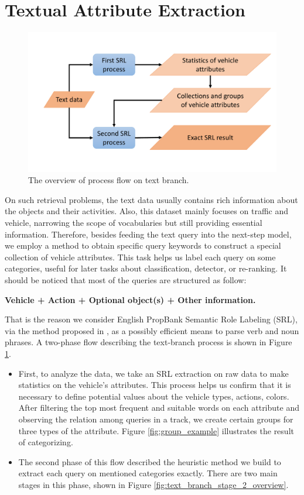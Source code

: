 \section{Textual Attribute Extraction}
\label{sec:text_extraction}
\begin{figure}[!htb]
    \centering
    \includegraphics[width=\textwidth]{resources/images/methods/text_branch_overview.pdf}
    \caption{The overview of process flow on text branch.}
    \label{fig:text_branch_overview}
\end{figure}
On such retrieval problems, the text data usually contains rich information about the objects and their activities. Also, this dataset mainly focuses on traffic and vehicle, narrowing the scope of vocabularies but still providing essential information. Therefore, besides feeding the text query into the next-step model, we employ a method to obtain specific query keywords to construct a special collection of vehicle attributes. This task helps us label each query on some categories, useful for later tasks about classification, detector, or re-ranking.
It should be noticed that most of the queries are structured as follow:

\textbf{Vehicle + Action + Optional object(s) + Other information.}

That is the reason we consider English PropBank Semantic Role Labeling (SRL), via the method proposed in \cite{shi2019simple}, as a possibly efficient means to parse verb and noun phrases. A two-phase flow describing the text-branch process is shown in Figure \ref{fig:text_branch_overview}.
\begin{itemize}
    \item First, to analyze the data, we take an SRL extraction on raw data to make statistics on the vehicle's attributes. This process helps us confirm that it is necessary to define potential values about the vehicle types, actions, colors. After filtering the top most frequent and suitable words on each attribute and observing the relation among queries in a track, we create certain groups for three types of the attribute. Figure \ref{fig:group_example} illustrates the result of categorizing.
    \item The second phase of this flow described the heuristic method we build to extract each query on mentioned categories exactly. There are two main stages in this phase, shown in Figure \ref{fig:text_branch_stage_2_overview}.
\end{itemize}

